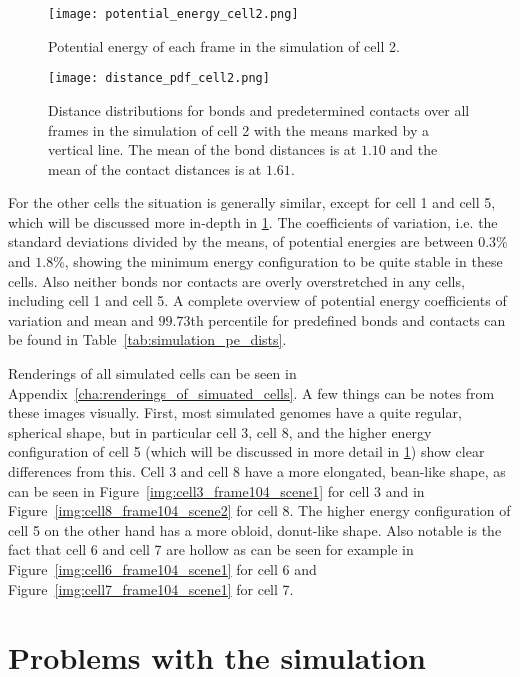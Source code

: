 \begin{figure}[ht]
\centering
  \texttt{[image: potential\_energy\_cell2.png]}
  \caption{Potential energy of each frame in the simulation of cell 2.}
  \label{fig:potential_energy_cell2}
\end{figure}

\begin{figure}[ht]
\centering
  \texttt{[image: distance\_pdf\_cell2.png]}
  \caption{Distance distributions for bonds and predetermined contacts over all frames in the simulation of cell 2 with the means marked by a vertical line. The mean of the bond distances is at \(\num{1.10}\) and the mean of the contact distances is at \(\num{1.61}\).}
  \label{fig:distance_pdf_cell2}
\end{figure}

For the other cells the situation is generally similar, except for cell 1 and cell 5, which will be discussed more in-depth in \ref{sec:problems_with_the_simulation}. The coefficients of variation, i.e. the standard deviations divided by the means, of potential energies are between \(0.3\%\) and \(1.8\%\), showing the minimum energy configuration to be quite stable in these cells. Also neither bonds nor contacts are overly overstretched in any cells, including cell 1 and cell 5. A complete overview of potential energy coefficients of variation and mean and \(99.73\)th percentile for predefined bonds and contacts can be found in Table~\ref{tab:simulation_pe_dists}.

Renderings of all simulated cells can be seen in Appendix~\ref{cha:renderings_of_simuated_cells}. A few things can be notes from these images visually. First, most simulated genomes have a quite regular, spherical shape, but in particular cell 3, cell 8, and the higher energy configuration of cell 5 (which will be discussed in more detail in \ref{sec:problems_with_the_simulation}) show clear differences from this. Cell 3 and cell 8 have a more elongated, bean-like shape, as can be seen in Figure~\ref{img:cell3_frame104_scene1} for cell 3 and in Figure~\ref{img:cell8_frame104_scene2} for cell 8. The higher energy configuration of cell 5 on the other hand has a more obloid, donut-like shape. Also notable is the fact that cell 6 and cell 7 are hollow as can be seen for example in Figure~\ref{img:cell6_frame104_scene1} for cell 6 and Figure~\ref{img:cell7_frame104_scene1} for cell 7.


\section{Problems with the simulation} %
\label{sec:problems_with_the_simulation}

